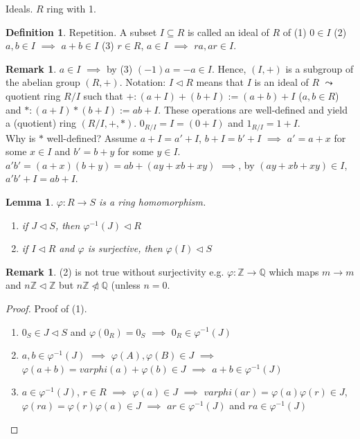 \documentclass[11pt]{article}
\newtheorem{lem}[thm]{Lemma}
\theoremstyle{definition}
\newtheorem{definition}[thm]{Definition}
\newtheorem{remark}[thm]{Remark}
\numberwithin{equation}{section}
\newcommand{\Q}{\mathbb{Q}}  %
\newcommand{\Z}{\mathbb{Z}}
\begin{document}
Ideals. $R$ ring with 1.
\begin{definition}
Repetition. A subset $I \subseteq R$ is called an ideal of $R$ of (1) $0 \in I$ (2) $a, b \in I$ $\implies$ $a + b \in I$ (3) $r \in R$, $a \in I$ $\implies$ $ra, ar \in I$.
\end{definition}

\begin{remark}
$a \in I$ $\implies$ by (3) $(-1)a = -a \in I$. Hence, $(I, +)$ is a subgroup of the abelian group $(R, +)$. Notation: $I \vartriangleleft R$ means that $I$ is an ideal of $R$ $\leadsto$ quotient ring $R/I$ such that $+: (a+I) + (b+I) := (a+b) + I$ ($a, b \in R$) and $*: (a+I)*(b+I) := ab + I$. These operations are well-defined and yield a (quotient) ring $(R/I,+,*)$. $0_{R/I} = I = (0+I)$ and $1_{R/I} = 1 + I$.\\
Why is $*$ well-defined? Assume $a+I = a'+I$, $b+I = b'+I$ $\implies$ $a' = a+x$ for some $x \in I$ and $b' = b+y$ for some $y \in I$. $a'b' = (a+x)(b+y) = ab + (ay + xb + xy)$ $\implies$, by $(ay + xb + xy) \in I$, $a'b' + I = ab + I$.
\end{remark}

\begin{lem}
$\varphi: R \rightarrow S$ is a ring homomorphism.
\begin{enumerate}
    \item if $J \vartriangleleft S$, then $\varphi^{-1}(J) \vartriangleleft R$
    \item if $I \vartriangleleft R$ and $\varphi$ is surjective, then $\varphi(I) \vartriangleleft S$
\end{enumerate}
\end{lem}

\begin{remark}
(2) is not true without surjectivity e.g. $\varphi: \Z \rightarrow \Q$ which maps $m \rightarrow m$ and $n\Z \vartriangleleft \Z$ but $n\Z \ntriangleleft \Q$ (unless $n = 0$.
\end{remark}

\begin{proof}
Proof of (1).
\begin{enumerate}
    \item $0_{S} \in J \vartriangleleft S$ and $\varphi(0_{R}) = 0_{S}$ $\implies$ $0_{R} \in \varphi^{-1}(J)$
    \item $a, b \in \varphi^{-1}(J)$ $\implies$ $\varphi(A), \varphi(B) \in J$ $\implies$ $\varphi(a+b) = varphi(a) + \varphi(b) \in J$ $\implies$ $a+b \in \varphi^{-1}(J)$
    \item $a \in \varphi^{-1}(J)$, $r \in R$ $\implies$ $\varphi(a) \in J$ $\implies$ $varphi(ar) = \varphi(a)\varphi(r) \in J$, $\varphi(ra) = \varphi(r)\varphi(a) \in J$ $\implies$ $ar \in \varphi^{-1}(J)$ and $ra \in \varphi^{-1}(J)$
\end{enumerate}
\end{proof}
\end{document}
